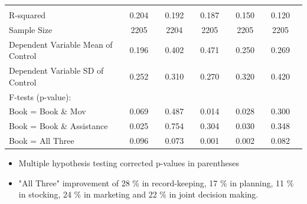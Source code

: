 \documentclass[hideothersubsections, usenames,dvipsnames,10pt]{beamer}
\begin{document}
\begin{frame}
{{\begin{table}[t]
\begin{tabular}{l*{10}{c}}
\hline         							
\\
R-squared									&               0.204   	 &&          0.192   	&&           0.187   	&&           0.150	 &&           0.120             \\
Sample Size 								&               2205   	  &&          2204   	   &&         2205   	 &&           2205   	    &&        2205      \\
Dependent Variable Mean of Control 		&                  0.196  	  &&         0.402   	 &&          0.471    &&	           0.250    	 &&          0.269          \\
Dependent Variable SD of Control 			&              0.252    	 &&          0.310   	  &&         0.270      	  &&         0.320    && 	           0.420        	\\
F-tests (p-value):							&			&&			&&			&&			\\
\hspace{5mm}Book = Book \& Mov				        &               0.069   	   &&           0.487   	  &&          0.014     	  &&          0.028    	 &&          0.300           \\
\hspace{5mm}Book = Book \& Assistance				        &               0.025  	  &&          0.754     	 &&           0.304   	 &&          0.030    	  &&          0.348                 \\
\hspace{5mm}Book = All Three				        &                  0.096    	  &&         0.073    	    &&      0.001   	  &&         0.002    &&	         0.082        \\
\hline
	\end{tabular}
\end{table}}}
\begin{itemize}
\item Multiple hypothesis testing corrected p-values in parentheses
\item "All Three" improvement of 28 \% in record-keeping, 17 \% in planning, 11 \% in stocking, 24 \% in marketing and 22 \% in joint decision making.
\end{itemize}
\end{frame}
\end{document}
